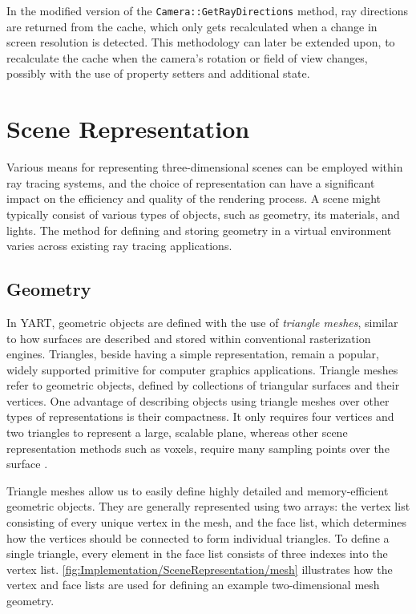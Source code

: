 In the modified version of the \verb|Camera::GetRayDirections| method, ray directions are returned from the cache, which only gets recalculated when a change in screen resolution is detected.
This methodology can later be extended upon, to recalculate the cache when the camera's rotation or field of view changes, possibly with the use of property setters and additional state.  

\section{Scene Representation}

Various means for representing three-dimensional scenes can be employed within ray tracing systems, and the choice of representation can have a significant impact on the efficiency and quality of the rendering process.  
A scene might typically consist of various types of objects, such as geometry, its materials, and lights. 
The method for defining and storing geometry in a virtual environment varies across existing ray tracing applications.

\subsection{Geometry}

In YART, geometric objects are defined with the use of \textit{triangle meshes}, similar to how surfaces are described and stored within conventional rasterization engines.
Triangles, beside having a simple representation, remain a popular, widely supported primitive for computer graphics applications. 
Triangle meshes refer to geometric objects, defined by collections of triangular surfaces and their vertices.
One advantage of describing objects using triangle meshes over other types of representations is their compactness.
It only requires four vertices and two triangles to represent a large, scalable plane, whereas other scene representation methods such as voxels, require many sampling points over the surface \supercite{Kato2018}.

\clearpage

Triangle meshes allow us to easily define highly detailed and memory-efficient geometric objects. 
They are generally represented using two arrays: the vertex list consisting of every unique vertex in the mesh, and the face list, which determines how the vertices should be connected to form individual triangles. 
To define a single triangle, every element in the face list consists of three indexes into the vertex list.
\cref{fig:Implementation/SceneRepresentation/mesh} illustrates how the vertex and face lists are used for defining an example two-dimensional mesh geometry.

